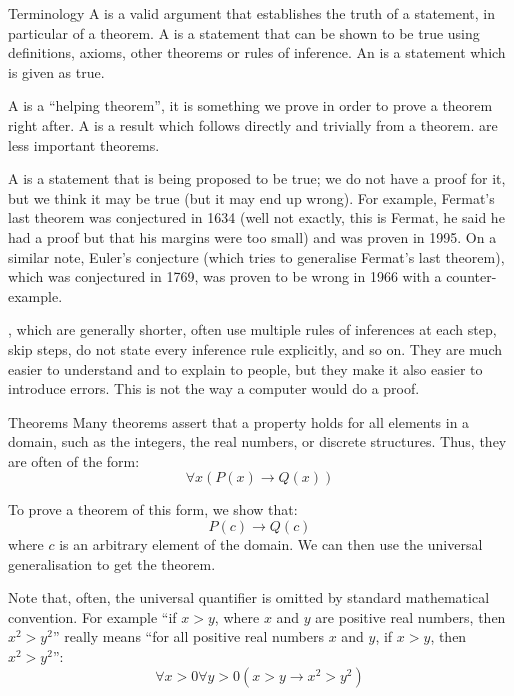 \documentclass{article}
\begin{document}
\begin{parag}{Terminology}
    A  is a valid argument that establishes the truth of a statement, in particular of a theorem. A  is a statement that can be shown to be true using definitions, axioms, other theorems or rules of inference. An  is a statement which is given as true.

    A  is a ``helping theorem'', it is something we prove in order to prove a theorem right after. A  is a result which follows directly and trivially from a theorem.  are less important theorems.

    A  is a statement that is being proposed to be true; we do not have a proof for it, but we think it may be true (but it may end up wrong). For example, Fermat's last theorem was conjectured in 1634 (well not exactly, this is Fermat, he said he had a proof but that his margins were too small) and was proven in 1995. On a similar note, Euler's conjecture (which tries to generalise Fermat's last theorem), which was conjectured in 1769, was proven to be wrong in 1966 with a counter-example.

    , which are generally shorter, often use multiple rules of inferences at each step, skip steps, do not state every inference rule explicitly, and so on. They are much easier to understand and to explain to people, but they make it also easier to introduce errors. This is not the way a computer would do a proof.
\end{parag}

\begin{parag}{Theorems}
    Many theorems assert that a property holds for all elements in a domain, such as the integers, the real numbers, or discrete structures. Thus, they are often of the form:
    \[\forall x\left(P\left(x\right) \to Q\left(x\right)\right)\]

    To prove a theorem of this form, we show that:
    \[P\left(c\right) \to Q\left(c\right)\]
    where $c$ is an  arbitrary element of the domain. We can then use the universal generalisation to get the theorem.

    Note that, often, the universal quantifier is omitted by standard mathematical convention. For example ``if $x > y$, where $x$ and $y$ are positive real numbers, then $x^2 > y^2$'' really means ``for all positive real numbers $x$ and $y$, if $x > y$, then $x^2 > y^2$'':
    \[\forall x > 0 \forall y > 0\left(x > y \to x^2 > y^2\right)\]
\end{parag}
\end{document}
